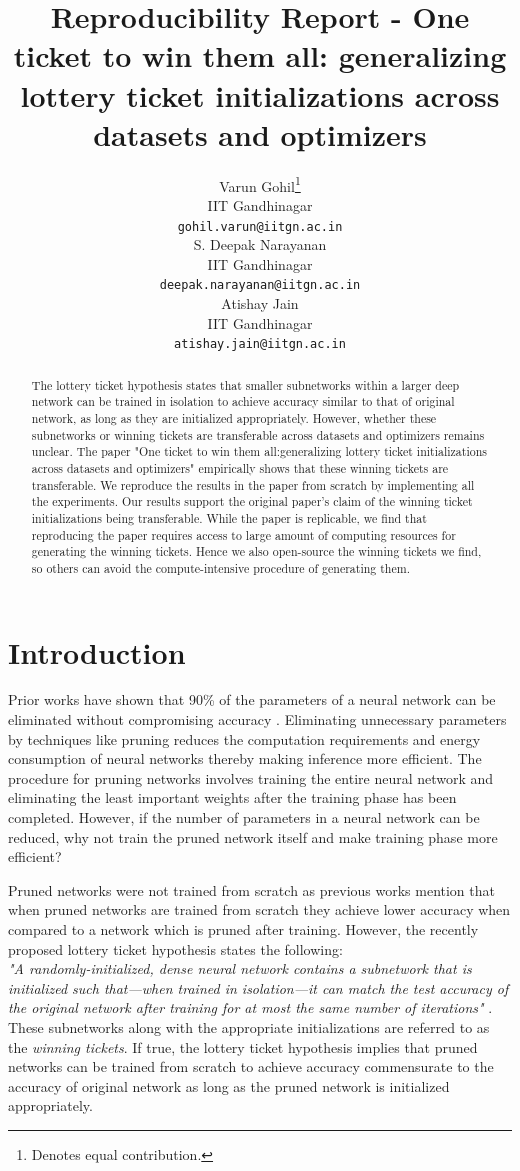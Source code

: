 \documentclass{article}
\title{Reproducibility Report - One ticket to win them all: generalizing lottery ticket initializations across datasets and optimizers}
\author{%
  Varun Gohil\thanks{Denotes equal contribution.} \\
  IIT Gandhinagar\\
  \texttt{gohil.varun@iitgn.ac.in} \\
  \And 
  S. Deepak Narayanan\printfnsymbol{*} \\
  IIT Gandhinagar\\
  \texttt{deepak.narayanan@iitgn.ac.in} \\
  \And
  Atishay Jain\printfnsymbol{*}\\
  IIT Gandhinagar\\
  \texttt{atishay.jain@iitgn.ac.in} \\
}
\begin{document}
\maketitle




\begin{abstract}
The lottery ticket hypothesis states that smaller subnetworks within a larger deep network can be trained in isolation to achieve accuracy similar to that of original network, as long as they are initialized appropriately. However, whether these subnetworks or winning tickets are transferable across datasets and optimizers remains unclear. The paper "One ticket to win them all:generalizing lottery ticket initializations across datasets and optimizers" empirically shows that these winning tickets are transferable. We reproduce the results in the paper from scratch by implementing all the experiments. 
Our results support the original paper's claim of the winning ticket initializations being transferable. While the paper is replicable, we find that reproducing the paper requires access to large amount of computing resources for generating the winning tickets. Hence we also open-source the winning tickets we find, so others can avoid the compute-intensive procedure of generating them.
\end{abstract}


\section{Introduction}
\label{sec:intro}
Prior works have shown that 90\% of the parameters of a neural network can be eliminated without compromising accuracy \cite{han_prune, ref2}. Eliminating unnecessary parameters by techniques like pruning reduces the computation requirements and energy consumption of neural networks thereby making inference more efficient. The procedure for pruning networks involves training the entire neural network and eliminating the least important weights after the training phase has been completed. However, if the number of parameters in a neural network can be reduced, why not train the pruned network itself and make training phase more efficient?

Pruned networks were not trained from scratch as previous works \cite{ref2, han_prune} mention that when pruned networks are trained from scratch they achieve lower accuracy when compared to a network which is pruned after training. However, the recently proposed lottery ticket hypothesis states the following:\\
\textit{"A randomly-initialized, dense neural network contains a subnetwork that is initialized such that—when trained in isolation—it can match the test accuracy of the original network after training for at most the same number of iterations"} \cite{lth_orig_paper}.
These subnetworks along with the appropriate initializations are referred to as the \textit{winning tickets}. If true, the lottery ticket hypothesis implies that pruned networks can be trained from scratch to achieve accuracy commensurate to the accuracy of original network as long as the pruned network is initialized appropriately. 
\end{document}
